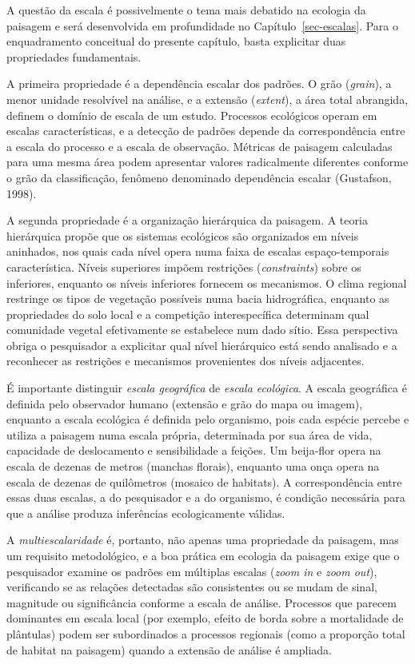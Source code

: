 \documentclass[
  portuguese,
  11pt,
  a4paper,
  open=any]{scrbook}
\begin{document}
A questão da escala é possivelmente o tema mais debatido na ecologia da
paisagem e será desenvolvida em profundidade no
Capítulo~\ref{sec-escalas}. Para o enquadramento conceitual do presente
capítulo, basta explicitar duas propriedades fundamentais.

A primeira propriedade é a dependência escalar dos padrões. O grão
(\emph{grain}), a menor unidade resolvível na análise, e a extensão
(\emph{extent}), a área total abrangida, definem o domínio de escala de
um estudo. Processos ecológicos operam em escalas características, e a
detecção de padrões depende da correspondência entre a escala do
processo e a escala de observação. Métricas de paisagem calculadas para
uma mesma área podem apresentar valores radicalmente diferentes conforme
o grão da classificação, fenômeno denominado dependência escalar
(Gustafson, 1998).

A segunda propriedade é a organização hierárquica da paisagem. A teoria
hierárquica propõe que os sistemas ecológicos são organizados em níveis
aninhados, nos quais cada nível opera numa faixa de escalas
espaço-temporais característica. Níveis superiores impõem restrições
(\emph{constraints}) sobre os inferiores, enquanto os níveis inferiores
fornecem os mecanismos. O clima regional restringe os tipos de vegetação
possíveis numa bacia hidrográfica, enquanto as propriedades do solo
local e a competição interespecífica determinam qual comunidade vegetal
efetivamente se estabelece num dado sítio. Essa perspectiva obriga o
pesquisador a explicitar qual nível hierárquico está sendo analisado e a
reconhecer as restrições e mecanismos provenientes dos níveis
adjacentes.

É importante distinguir \emph{escala geográfica} de \emph{escala
ecológica}. A escala geográfica é definida pelo observador humano
(extensão e grão do mapa ou imagem), enquanto a escala ecológica é
definida pelo organismo, pois cada espécie percebe e utiliza a paisagem
numa escala própria, determinada por sua área de vida, capacidade de
deslocamento e sensibilidade a feições. Um beija-flor opera na escala de
dezenas de metros (manchas florais), enquanto uma onça opera na escala
de dezenas de quilômetros (mosaico de habitats). A correspondência entre
essas duas escalas, a do pesquisador e a do organismo, é condição
necessária para que a análise produza inferências ecologicamente
válidas.

A \emph{multiescalaridade} é, portanto, não apenas uma propriedade da
paisagem, mas um requisito metodológico, e a boa prática em ecologia da
paisagem exige que o pesquisador examine os padrões em múltiplas escalas
(\emph{zoom in} e \emph{zoom out}), verificando se as relações
detectadas são consistentes ou se mudam de sinal, magnitude ou
significância conforme a escala de análise. Processos que parecem
dominantes em escala local (por exemplo, efeito de borda sobre a
mortalidade de plântulas) podem ser subordinados a processos regionais
(como a proporção total de habitat na paisagem) quando a extensão de
análise é ampliada.
\end{document}
